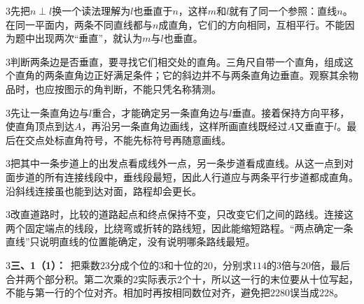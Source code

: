 \documentclass[multi=snippet,border={5bp 20bp 5bp 5bp}]{standalone}
\newenvironment{snippet}[3]{\begin{minipage}{#1bp}\color{answerred}\fontsize{#2}{#3}\selectfont\raggedright}{\end{minipage}}
\begin{document}
\begin{snippet}{505}{11.5}{14}\begin{multicols}{3}\raggedcolumns 先把\(n\perp l\)\allowbreak 换一个读法理解为\(l\)\allowbreak 也垂直于\(n\)\allowbreak ，这样\(m\)\allowbreak 和\(l\)\allowbreak 就有了同一个参照：直线\(n\)\allowbreak 。在同一平面内，两条不同直线都与\(n\)\allowbreak 成直角，它们的方向相同，互相平行。不能因为题中出现两次“垂直”，就认为\(m\)\allowbreak 与\(l\)\allowbreak 也垂直。\end{multicols}\end{snippet}
\begin{snippet}{505}{11.5}{14}\begin{multicols}{3}\raggedcolumns 判断两条边是否垂直，要寻找它们相交处的直角。三角尺自带一个直角，组成这个直角的两条直角边正好满足条件；它的斜边并不与两条直角边垂直。观察其余物品时，也应按图示的角判断，不能只凭名称猜测。\end{multicols}\end{snippet}
\begin{snippet}{505}{11.5}{14}\begin{multicols}{3}\raggedcolumns 先让一条直角边与\(l\)\allowbreak 重合，才能确定另一条直角边与\(l\)\allowbreak 垂直。接着保持方向平移，使直角顶点到达\(A\)\allowbreak ，再沿另一条直角边画线，这样所画直线既经过\(A\)\allowbreak 又垂直于\(l\)\allowbreak 。最后在交点处标直角符号，不能先标符号再随意画线。\end{multicols}\end{snippet}
\begin{snippet}{505}{11.5}{14}\begin{multicols}{3}\raggedcolumns 把其中一条步道上的出发点看成线外一点，另一条步道看成直线。从这一点到对面步道的所有连接线段中，垂线段最短，因此人行道应与两条平行步道都成直角。沿斜线连接虽也能到达对面，路程却会更长。\end{multicols}\end{snippet}
\begin{snippet}{505}{11.5}{14}\begin{multicols}{3}\raggedcolumns 改直道路时，比较的道路起点和终点保持不变，只改变它们之间的路线。连接这两个固定端点的线段，比绕弯或折转的路线短，因此能缩短路程。“两点确定一条直线”只说明直线的位置能确定，没有说明哪条路线最短。\end{multicols}\end{snippet}
\begin{snippet}{505}{11.5}{14}\begin{multicols}{3}\raggedcolumns \textbf{三、1（1）：}\ 把乘数\(23\)\allowbreak 分成个位的\(3\)\allowbreak 和十位的\(20\)\allowbreak ，分别求\(114\)\allowbreak 的\(3\)\allowbreak 倍与\(20\)\allowbreak 倍，最后合并两个部分积。第二次乘的\(2\)\allowbreak 实际表示\(2\)\allowbreak 个十，所以这一行的末位要从十位写起，不能与第一行的个位对齐。相加时再按相同数位对齐，避免把\(2280\)\allowbreak 误当成\(228\)\allowbreak 。\end{multicols}\end{snippet}
\end{document}

